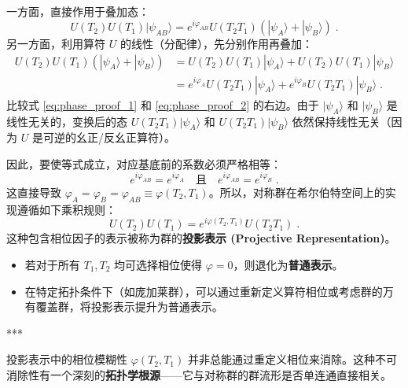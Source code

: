 一方面，直接作用于叠加态：
\begin{equation}
    U(T_2)U(T_1) |\psi_{AB}\rangle = e^{i\varphi_{AB}} U(T_2 T_1) (|\psi_A\rangle + |\psi_B\rangle) \;. \label{eq:phase_proof_1}
\end{equation}
另一方面，利用算符 $U$ 的线性（分配律），先分别作用再叠加：
\begin{equation}
    \begin{aligned}
        U(T_2)U(T_1) (|\psi_A\rangle + |\psi_B\rangle) &= U(T_2)U(T_1)|\psi_A\rangle + U(T_2)U(T_1)|\psi_B\rangle \\
        &= e^{i\varphi_A} U(T_2 T_1)|\psi_A\rangle + e^{i\varphi_B} U(T_2 T_1)|\psi_B\rangle \;.
    \end{aligned} \label{eq:phase_proof_2}
\end{equation}
比较式 \eqref{eq:phase_proof_1} 和 \eqref{eq:phase_proof_2} 的右边。由于 $|\psi_A\rangle$ 和 $|\psi_B\rangle$ 是线性无关的，变换后的态 $U(T_2 T_1)|\psi_A\rangle$ 和 $U(T_2 T_1)|\psi_B\rangle$ 依然保持线性无关（因为 $U$ 是可逆的幺正/反幺正算符）。

因此，要使等式成立，对应基底前的系数必须严格相等：
\begin{equation}
    e^{i\varphi_{AB}} = e^{i\varphi_A} \quad \text{且} \quad e^{i\varphi_{AB}} = e^{i\varphi_B} \;.
\end{equation}
这直接导致 $\varphi_A = \varphi_B = \varphi_{AB} \equiv \varphi(T_2, T_1)$。所以，对称群在希尔伯特空间上的实现遵循如下乘积规则：
\begin{equation}
    U(T_2)U(T_1) = e^{i\varphi(T_2, T_1)} U(T_2 T_1) \;. \label{eq:projective_rep}
\end{equation}
这种包含相位因子的表示被称为群的\textbf{投影表示 (Projective Representation)}。
\begin{itemize}
    \item 若对于所有 $T_1, T_2$ 均可选择相位使得 $\varphi=0$，则退化为\textbf{普通表示}。
    \item 在特定拓扑条件下（如庞加莱群），可以通过重新定义算符相位或考虑群的万有覆盖群，将投影表示提升为普通表示。
\end{itemize}
\vspace{2ex}\begin{center}
    ***
\end{center}\vspace{2ex}
投影表示中的相位模糊性 $\varphi(T_2, T_1)$ 并非总能通过重定义相位来消除。这种不可消除性有一个深刻的\textbf{拓扑学根源}——它与对称群的群流形是否单连通直接相关。


